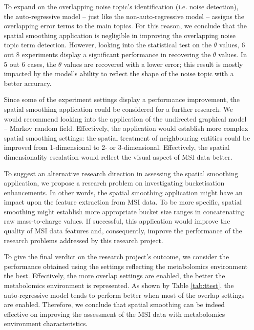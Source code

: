 \documentclass{mpaper}
\begin{document}
\par To expand on the overlapping noise topic's identification (i.e. noise detection), the auto-regressive model -- just like the non-auto-regressive model -- assigns the overlapping error terms to the main topics. For this reason, we conclude that the spatial smoothing application is negligible in improving the overlapping noise topic term detection. However, looking into the statistical test on the $\theta$ values, $6$ out $8$ experiments display a significant performance in recovering the $\theta$ values. In $5$ out $6$ cases, the $\theta$ values are recovered with a lower error; this result is mostly impacted by the model's ability to reflect the shape of the noise topic with a better accuracy. 

\par Since some of the experiment settings display a performance improvement, the spatial smoothing application could be considered for a further research. We would recommend looking into the application of the undirected graphical model -- Markov random field. Effectively, the application would establish more complex spatial smoothing settings: the spatial treatment of neighbouring entities could be improved from 1-dimensional to 2- or 3-dimensional. Effectively, the spatial dimensionality escalation would reflect the visual aspect of MSI data better. 

\par To suggest an alternative research direction in assessing the spatial smoothing application, we propose a research problem on investigating bucketisation enhancements. In other words, the spatial smoothing application might have an impact upon the feature extraction from MSI data. To be more specific, spatial smoothing might establish more appropriate bucket size ranges in concatenating raw mass-to-charge values. If successful, this application would improve the quality of MSI data features and, consequently, improve the performance of the research problems addressed by this research project. 

\par To give the final verdict on the research project's outcome, we consider the performance obtained using the settings reflecting the metabolomics environment the best. Effectively, the more overlap settings are enabled, the better the metabolomics environment is represented. As shown by Table \ref{tab:ttest}, the auto-regressive model tends to perform better when most of the overlap settings are enabled. Therefore, we conclude that spatial smoothing can be indeed effective on improving the assessment of the MSI data with metabolomics environment characteristics.



\end{document}
